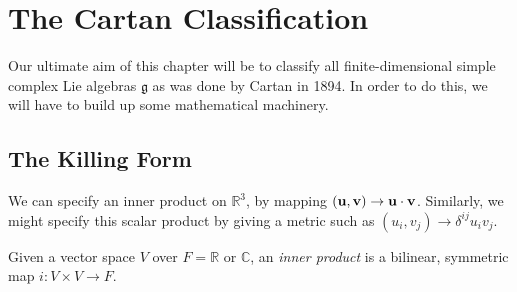 \chapter{The Cartan Classification}%
\label{cha:cartan_classification}

Our ultimate aim of this chapter will be to classify all finite-dimensional simple complex Lie algebras $\mathfrak{g}$ as was done by Cartan in 1894. In order to do this, we will have to build up some mathematical machinery.

\section{The Killing Form}%
\label{sec:the_killing_form}

We can specify an inner product on $\mathbb{R}^3$, by mapping $(\vb{u}, \vb{v}) \to \vb{u} \cdot \vb{v}$. 
Similarly, we might specify this scalar product by giving a metric such as $(u_i, v_j) \to \delta^{ij} u_i v_j$.

\begin{definition}
  Given a vector space $V$ over $F = \mathbb{R}$ or $\mathbb{C}$, an \emph{inner product} is a bilinear, symmetric map $i\colon V \times V \to F$.
\end{definition}

